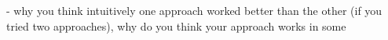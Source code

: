 - why you think intuitively one approach worked better than the other (if you tried two approaches), why do you think your approach works in some 

